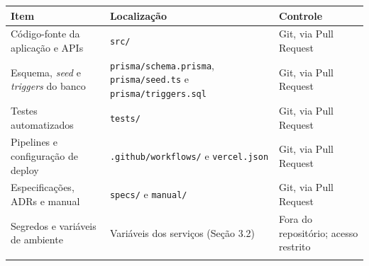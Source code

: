 {\footnotesize
\begin{tabularx}{\textwidth}{>{\hsize=1.146\hsize\sloppy\arraybackslash}X >{\hsize=0.955\hsize\sloppy\arraybackslash}X >{\hsize=0.898\hsize\sloppy\arraybackslash}X}
\arrayrulecolor{GithubTableBorder}\toprule
\rowcolor{BrandTableHeader}
\textbf{Item} & \textbf{Localização} & \textbf{Controle} \\
\midrule
\arrayrulecolor{BrandGrayRule}
Código-fonte da aplicação e APIs & \texttt{src/} & Git, via Pull Request \\
\midrule
Esquema, \emph{seed} e \emph{triggers} do banco & \texttt{prisma/\allowbreak{}schema.\allowbreak{}prisma}, \texttt{prisma/\allowbreak{}seed.ts} e \texttt{prisma/\allowbreak{}triggers.\allowbreak{}sql} & Git, via Pull Request \\
\midrule
Testes automatizados & \texttt{tests/} & Git, via Pull Request \\
\midrule
Pipelines e configuração de deploy & \texttt{.\allowbreak{}github/\allowbreak{}workflows/} e \texttt{vercel.json} & Git, via Pull Request \\
\midrule
Especificações, ADRs e manual & \texttt{specs/} e \texttt{manual/} & Git, via Pull Request \\
\midrule
Segredos e variáveis de ambiente & Variáveis dos serviços (Seção 3.2) & Fora do repositório; acesso restrito \\
\arrayrulecolor{GithubTableBorder}\bottomrule
\end{tabularx}%
}
